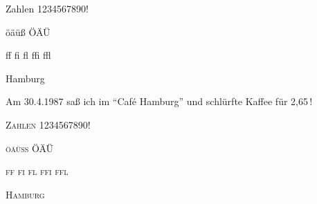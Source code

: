 \documentclass{article}
\begin{document}
{\Huge
Zahlen 1234567890!\par
öäüß ÖÄÜ\SS\par
ff fi fl ffi ffl\par
Hamburg\par
}

\bigskip
Am 30.4.1987 saß ich im "`Caf\'e Hamburg"' und schlürfte Kaffee für 2,65\,{\texteuro}!

{\Huge
\textsc{Zahlen 1234567890!}\par
\textsc{öäüß ÖÄÜ\SS}\par
\textsc{ff fi fl ffi ffl}\par
\textsc{Hamburg}\par
}
\end{document}
